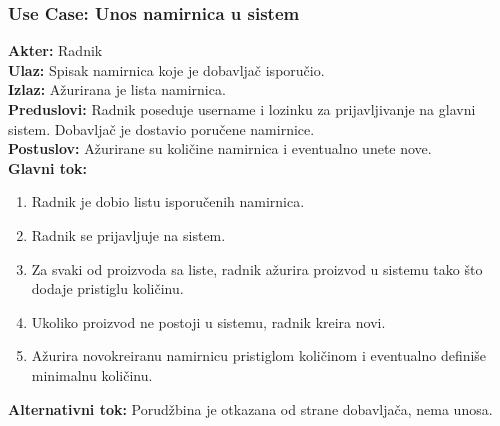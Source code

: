 \documentclass{article}
\begin{document}
\subsubsection{\textbf{Use Case}: Unos namirnica u sistem}
\textbf{Akter:} Radnik\\
\textbf{Ulaz:} Spisak namirnica koje je dobavljač isporučio.\\
\textbf{Izlaz:} Ažurirana je lista namirnica.\\
\textbf{Preduslovi:} Radnik poseduje username i lozinku za prijavljivanje na glavni sistem. Dobavljač je dostavio poručene namirnice.\\
\textbf{Postuslov:} Ažurirane su količine namirnica i eventualno unete nove.\\
\textbf{Glavni tok:} 
\begin{enumerate}
	\item Radnik je dobio listu isporučenih namirnica.
	\item Radnik se prijavljuje na sistem.
	\item Za svaki od proizvoda sa liste, radnik ažurira proizvod u sistemu tako što dodaje pristiglu količinu.
	\item Ukoliko proizvod ne postoji u sistemu, radnik kreira novi.
	\item Ažurira novokreiranu namirnicu pristiglom količinom i eventualno definiše minimalnu količinu. 
\end{enumerate}
\textbf{Alternativni tok:} Porudžbina je otkazana od strane dobavljača, nema unosa.\\
\end{document}
